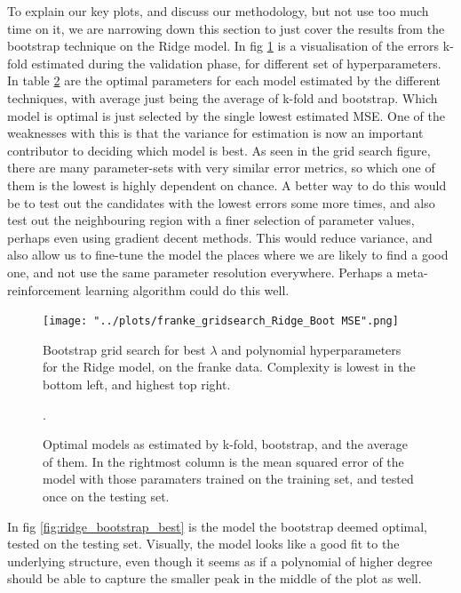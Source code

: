 \documentclass[11pt, a4paper]{report}
\begin{document}
To explain our key plots, and discuss our methodology, but not use too much time on it, we are narrowing down this section to just cover the results from the bootstrap technique on the Ridge model. In fig \ref{fig:grid_ridge_kfold_franke} is a visualisation of the errors k-fold estimated during the validation phase, for different set of hyperparameters. In table \ref{table:optimal_models_franke} are the optimal parameters for each model estimated by the different techniques, with average just being the average of k-fold and bootstrap. Which model is optimal is just selected by the single lowest estimated MSE. One of the weaknesses with this is that the variance for estimation is now an important contributor to deciding which model is best. As seen in the grid search figure, there are many parameter-sets with very similar error metrics, so which one of them is the lowest is highly dependent on chance. A better way to do this would be to test out the candidates with the lowest errors some more times, and also test out the neighbouring region with a finer selection of parameter values, perhaps even using gradient decent methods. This would reduce variance, and also allow us to fine-tune the model the places where we are likely to find a good one, and not use the same parameter resolution everywhere. Perhaps a meta-reinforcement learning algorithm could do this well.

\begin{figure}
\texttt{[image: "../plots/franke\_gridsearch\_Ridge\_Boot MSE".png]}
\caption{Bootstrap grid search for best $\lambda$ and polynomial hyperparameters for the Ridge model, on the franke data. Complexity is lowest in the bottom left, and highest top right.}
\label{fig:grid_ridge_kfold_franke}
\end{figure}

\begin{figure}
\begin{center}
\caption{Optimal models as estimated by k-fold, bootstrap, and the average of them. In the rightmost column is the mean squared error of the model with those paramaters trained on the training set, and tested once on the testing set.} 
.
\label{table:optimal_models_franke}
\end{center}
\end{figure}

In fig \ref{fig:ridge_bootstrap_best} is the model the bootstrap deemed optimal, tested on the testing set. Visually, the model looks like a good fit to the underlying structure, even though it seems as if a polynomial of higher degree should be able to capture the smaller peak in the middle of the plot as well.
\end{document}
